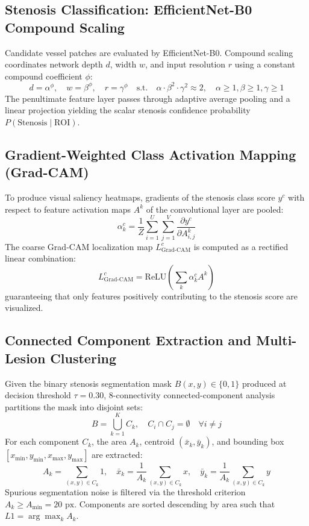 \subsection{Stenosis Classification: EfficientNet-B0 Compound Scaling}
Candidate vessel patches are evaluated by EfficientNet-B0. Compound scaling coordinates network depth $d$, width $w$, and input resolution $r$ using a constant compound coefficient $\phi$:
\begin{equation}
d = \alpha^\phi, \quad w = \beta^\phi, \quad r = \gamma^\phi \quad \text{s.t.} \quad \alpha \cdot \beta^2 \cdot \gamma^2 \approx 2, \quad \alpha \ge 1, \beta \ge 1, \gamma \ge 1
\end{equation}
The penultimate feature layer passes through adaptive average pooling and a linear projection yielding the scalar stenosis confidence probability $P(\text{Stenosis} \mid \text{ROI})$.

\subsection{Gradient-Weighted Class Activation Mapping (Grad-CAM)}
To produce visual saliency heatmaps, gradients of the stenosis class score $y^c$ with respect to feature activation maps $A^k$ of the convolutional layer are pooled:
\begin{equation}
\alpha_k^c = \frac{1}{Z} \sum_{i=1}^U \sum_{j=1}^V \frac{\partial y^c}{\partial A_{i,j}^k}
\end{equation}
The coarse Grad-CAM localization map $L_{\text{Grad-CAM}}^c$ is computed as a rectified linear combination:
\begin{equation}
L_{\text{Grad-CAM}}^c = \text{ReLU}\left( \sum_k \alpha_k^c A^k \right)
\end{equation}
guaranteeing that only features positively contributing to the stenosis score are visualized.

\subsection{Connected Component Extraction and Multi-Lesion Clustering}
Given the binary stenosis segmentation mask $B(x, y) \in \{0, 1\}$ produced at decision threshold $\tau = 0.30$, 8-connectivity connected-component analysis partitions the mask into disjoint sets:
\begin{equation}
B = \bigcup_{k=1}^K C_k, \quad C_i \cap C_j = \emptyset \quad \forall i \neq j
\end{equation}
For each component $C_k$, the area $A_k$, centroid $(\bar{x}_k, \bar{y}_k)$, and bounding box $[x_{\min}, y_{\min}, x_{\max}, y_{\max}]$ are extracted:
\begin{equation}
A_k = \sum_{(x,y) \in C_k} 1, \quad \bar{x}_k = \frac{1}{A_k} \sum_{(x,y) \in C_k} x, \quad \bar{y}_k = \frac{1}{A_k} \sum_{(x,y) \in C_k} y
\end{equation}
Spurious segmentation noise is filtered via the threshold criterion $A_k \ge A_{\min} = 20\text{ px}$. Components are sorted descending by area such that $L1 = \arg\max_k A_k$.

